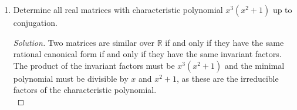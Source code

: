\documentclass[11pt,letterpaper]{report}
\newcommand{\rationals}{\mathbb{Q}}
\newenvironment{solution}
{\begin{proof}[Solution]}
{\end{proof}}
\begin{document}
\begin{enumerate}
\begin{proof}
		\noindent Let $\Gamma$ be the Galois group of $\rationals(\rho, \zeta)$ over $\rationals$ and let $\sigma_{a,b}$ be the map that sends $\zeta$ to $\zeta^a$ and $\rho$ to $\rho\zeta^b$. Call the group of matrices we're interested in $G$. Define the map $\varphi: \Gamma \to G$ by
		\[
		\sigma_{a,b}\mapsto \begin{pmatrix}
			a & b\\
			0 & 1
		\end{pmatrix}.
		\]
		The identity map in $\Gamma$ is $\sigma_{1, 0}$, which clearly maps to the identity matrix under $\varphi$. Let's compose two elements $\sigma_{a,b}$ and $\sigma_{c,d}$ from $\Gamma$.
		\begin{align*}
		(\sigma_{a,b}\circ \sigma_{c,d})(\rho) &= \sigma_{a,b}(\rho\zeta^d)\\ &= \rho\zeta^{ad+b}\\
		(\sigma_{a,b}\circ\sigma_{c,d})(\zeta) &= \sigma_{a,b}(\zeta^c)\\
		&= \zeta^{ac}.
		\end{align*}
		This gives $\sigma_{a,b}\circ\sigma_{c,d} = \sigma_{ac, ad+b}$. We also have
		\[
		\begin{pmatrix}
			a & b\\
			0 & 1
		\end{pmatrix}\begin{pmatrix}
			c & d\\
			0 & 1
		\end{pmatrix} = \begin{pmatrix}
			ac & ad+b\\
			0 & 1
		\end{pmatrix}.
		\]
		Thus, this correspondence is homomorphic. That $\varphi$ is surjective is clear and injectivity follows from comparing entries, so $\varphi$ is an isomorphism.
	\end{proof}

	\item Determine all real matrices with characteristic polynomial $x^3(x^2+1)$ up to conjugation.
	\begin{solution}
		Two matrices are similar over $\mathbb{R}$ if and only if they have the same rational canonical form if and only if they have the same invariant factors. The product of the invariant factors must be $x^3(x^2+1)$ and the minimal polynomial must be divisible by $x$ and $x^2+1$, as these are the irreducible factors of the characteristic polynomial.\\


\end{solution}
\end{enumerate}
\end{document}
